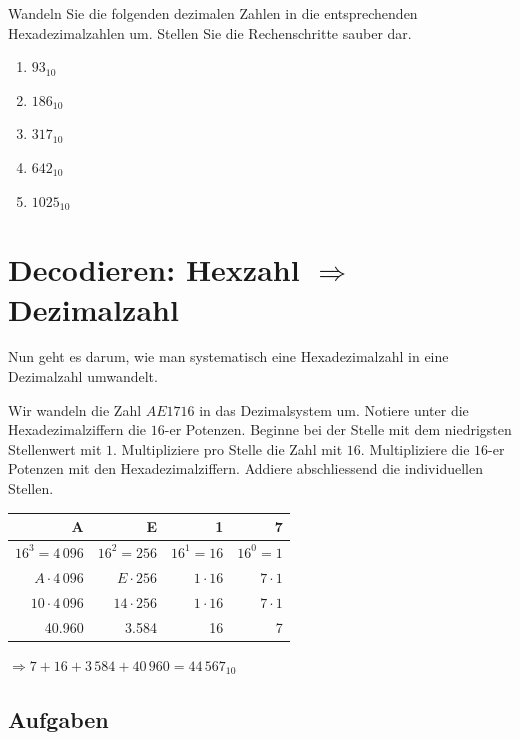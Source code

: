 Wandeln Sie die folgenden dezimalen Zahlen in die entsprechenden Hexadezimalzahlen um. Stellen Sie die Rechenschritte sauber dar.

\begin{enumerate}
\item $93_{10}$
\fillwithgrid{1.25in}
\item $186_{10}$
\fillwithgrid{1.25in}
\item $317_{10}$
\fillwithgrid{1.25in}
\item $\num{642}_{10}$
\fillwithgrid{1.5in}
\item $\num{1025}_{10}$
\fillwithgrid{1.5in}
\end{enumerate}

\section{Decodieren: Hexzahl $\Rightarrow$ Dezimalzahl}

Nun geht es darum, wie man systematisch eine Hexadezimalzahl in eine Dezimalzahl umwandelt.

\begin{example}
Wir wandeln die Zahl $AE17{16}$ in das Dezimalsystem um. Notiere unter die Hexadezimalziffern die $16$-er Potenzen. Beginne bei der Stelle mit dem niedrigsten Stellenwert mit $1$. Multipliziere pro Stelle die Zahl mit $16$. Multipliziere die $16$-er Potenzen mit den Hexadezimalziffern. Addiere abschliessend die individuellen Stellen.

\begin{table}[htb]
\centering
\begin{tabular}{|r|r|r|r|}
\hline
A  & E  & 1  & 7 \\ \hline
$16^3 = 4\,096$  & $16^2 = 256$  & $16^1 = 16$  & $16^0 = 1$ \\ \hline
$A \cdot 4\,096$ & $E \cdot 256$ & $1 \cdot 16$  & $7 \cdot 1$  \\ \hline
$10 \cdot 4\,096$ & $14 \cdot 256$ & $1 \cdot 16$  & $7 \cdot 1$  \\ \hline\hline
40.960 & 3.584 & 16 & 7 \\ \hline
\end{tabular}
\end{table}

$\Rightarrow 7 + 16 + 3\,584 + 40\,960 = 44\,567_{10}$

\end{example}

\subsection{Aufgaben}
\label{subsection-hex2dez-aufgaben}

